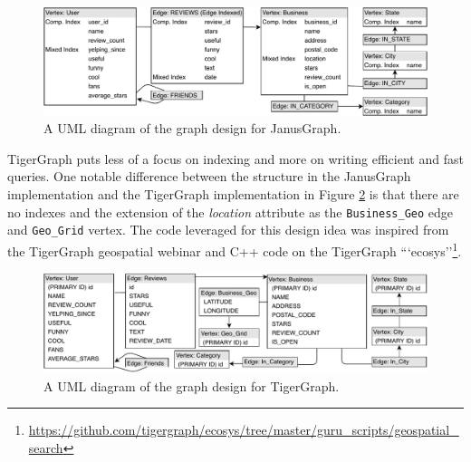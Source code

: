 \begin{figure}[h]
    \centering
    \includegraphics[width=16cm]{img/janus-design.pdf}
    \caption{A UML diagram of the graph design for JanusGraph.}
    \label{fig:janusgraph-design}
\end{figure}

TigerGraph puts less of a focus on indexing and more on writing efficient and fast queries. One notable difference between the structure in the JanusGraph implementation and the TigerGraph implementation in Figure \ref{fig:tigergraph-design} is that there are no indexes and the extension of the \emph{location} attribute as the \texttt{Business\_Geo} edge and \texttt{Geo\_Grid} vertex. The code leveraged for this design idea was inspired from the TigerGraph geospatial webinar \cite{graphgurus} and C++ code on the TigerGraph ```ecosys''\footnote{\url{https://github.com/tigergraph/ecosys/tree/master/guru\_scripts/geospatial\_search}}.

\begin{figure}[h]
    \centering
    \includegraphics[width=16cm]{img/tigergraph-design.pdf}
    \caption{A UML diagram of the graph design for TigerGraph.}
    \label{fig:tigergraph-design}
\end{figure}

